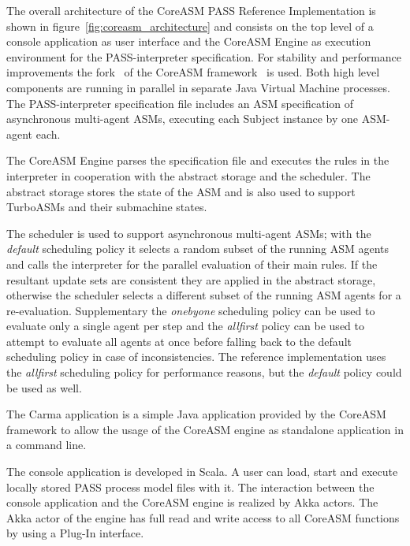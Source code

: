 
The overall architecture of the CoreASM PASS Reference Implementation is shown in
figure~\ref{fig:coreasm_architecture} and consists on the top level of
a console application as user interface and the CoreASM Engine as execution environment for the PASS-interpreter specification.
For stability and performance improvements the fork~\cite{Web:CoreASM-Fork} of the CoreASM framework~\cite{Farahbod2011} is used.
Both high level components are running in parallel in separate Java Virtual Machine processes.
The PASS-interpreter specification file includes an ASM specification of asynchronous multi-agent ASMs,
executing each Subject instance by one ASM-agent each.


The CoreASM Engine parses the specification file and executes the rules in the interpreter
in cooperation with the abstract storage and the scheduler.
The abstract storage stores the state of the ASM and is also used to support
TurboASMs and their submachine states.

The scheduler is used to support asynchronous multi-agent ASMs; with
the \textit{default} scheduling policy it selects
a random subset of the running ASM agents and calls the
interpreter for the parallel evaluation of their main rules.
If the resultant update sets
are consistent they are applied in the abstract storage, otherwise the scheduler
selects a different subset of the running ASM agents for a re-evaluation.
Supplementary the \textit{onebyone} scheduling policy can be used to evaluate
only a single agent per step and the \textit{allfirst} policy can be used
to attempt to evaluate all agents at once before falling back
to the default scheduling policy in case of inconsistencies.
The reference implementation uses the \textit{allfirst} scheduling policy for performance reasons,
but the \textit{default} policy could be used as well.

The Carma application is a simple Java application provided by the CoreASM framework
to allow the usage of the CoreASM engine as standalone application in a command line.

The console application is developed in Scala.
A user can load, start and execute locally stored PASS process model files with it.
The interaction between the console application and the CoreASM engine is realized by Akka actors.
The Akka actor of the engine has full read and write access to all CoreASM functions by using a Plug-In interface.



